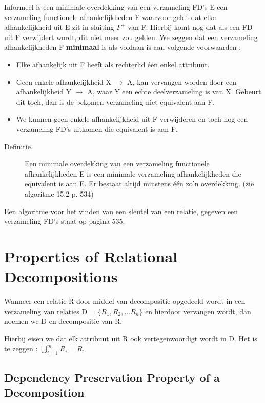 			Informeel is een minimale overdekking van een verzameling FD's E een verzameling functionele afhankelijkheden F waarvoor geldt dat elke afhankelijkheid uit E zit in 							sluiting $F^+$ van F. Hierbij komt nog dat als een FD uit F verwijdert wordt, dit niet meer zou gelden. We zeggen dat een verzameling afhankelijkheden F \textbf{minimaal} is 					als voldaan is aan volgende voorwaarden : 
			
			\begin{itemize}
				\item 	Elke afhankelijk uit F heeft als rechterlid \'e\'en enkel attribuut.
				\item 	Geen enkele afhankelijkheid X $\rightarrow$ A, kan vervangen worden door een afhankelijkheid Y $\rightarrow$ A, waar Y een echte deelverzameling is van X. Gebeurt 						dit toch, dan is de bekomen verzameling niet equivalent aan F.
				\item 	We kunnen geen enkele afhankelijkheid uit F verwijderen en toch nog een verzameling FD's uitkomen die equivalent is aan F.
			\end{itemize}
			
			\begin{description}
				\item[Definitie. ] Een minimale overdekking van een verzameling functionele afhankelijkheden E is een minimale verzameling afhankelijkheden die equivalent is aan E. Er 						bestaat altijd minstens \'e\'en zo'n overdekking. (zie algoritme 15.2 p. 534)
			\end{description}
			
			Een algoritme voor het vinden van een sleutel van een relatie, gegeven een verzameling FD's staat op pagina 535.
			
			\section{Properties of Relational Decompositions}
			
				Wanneer een relatie R door middel van decompositie opgedeeld wordt in een verzameling van relaties D = $\lbrace R_1, R_2, ... R_n\rbrace$ en hierdoor vervangen wordt, dan 						noemen we D en decompositie van R. 
				
				Hierbij eisen we dat elk attribuut uit R ook vertegenwoordigt wordt in D. Het is te zeggen : $ \bigcup_{i=1}^m R_i = R$. 
				
				\subsection{Dependency Preservation Property of a Decomposition}
				
